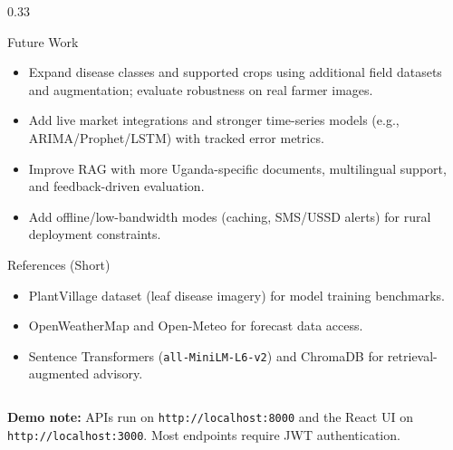 \documentclass[final]{beamer}
\begin{document}
\begin{frame}[t]
\begin{columns}[t,totalwidth=\linewidth]
\begin{column}{0.33\linewidth}
\begin{block}{Future Work}
\begin{itemize}
  \item Expand disease classes and supported crops using additional field datasets and augmentation; evaluate robustness on real farmer images.
  \item Add live market integrations and stronger time-series models (e.g., ARIMA/Prophet/LSTM) with tracked error metrics.
  \item Improve RAG with more Uganda-specific documents, multilingual support, and feedback-driven evaluation.
  \item Add offline/low-bandwidth modes (caching, SMS/USSD alerts) for rural deployment constraints.
\end{itemize}
\end{block}

\begin{block}{References (Short)}
\begin{itemize}
  \item PlantVillage dataset (leaf disease imagery) for model training benchmarks.
  \item OpenWeatherMap and Open-Meteo for forecast data access.
  \item Sentence Transformers (\texttt{all-MiniLM-L6-v2}) and ChromaDB for retrieval-augmented advisory.
\end{itemize}
\end{block}

\end{column}

\end{columns}

\vspace{0.35em}
\begin{center}
{\large \color{BrandGray}\textbf{Demo note:} APIs run on \texttt{http://localhost:8000} and the React UI on \texttt{http://localhost:3000}. Most endpoints require JWT authentication.}
\end{center}

\end{frame}
\end{document}
